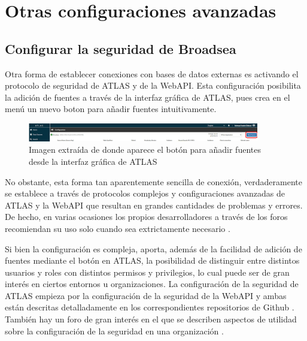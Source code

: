 
\section{Otras configuraciones avanzadas} \label{sec:04ConfigAvanzada}

\subsection{Configurar la seguridad de Broadsea} \label{subsec:04Seguridad}

Otra forma de establecer conexiones con bases de datos externas es activando el protocolo de seguridad de ATLAS y de la WebAPI. Esta configuración posibilita la adición de fuentes a través de la interfaz gráfica de ATLAS, pues crea en el menú  un nuevo boton para añadir fuentes intuitivamente. 

\begin{figure}[H]
    \centering
    \includegraphics[width=0.90\textwidth]{figures/capNewSource.png}
    \caption{Imagen extraída de \parencite{forumAddMSDB} donde aparece el botón para añadir fuentes desde la interfaz gráfica de ATLAS}
    \label{fig:capNewSource}
\end{figure}

No obstante, esta forma tan aparentemente sencilla de conexión, verdaderamente se establece a través de protocolos complejos y configuraciones avanzadas de ATLAS y la WebAPI que resultan en grandes cantidades de problemas y errores. De hecho, en varias ocasiones los propios desarrolladores a través de los foros recomiendan su uso solo cuando sea extrictamente necesario \parencite{forumAddMSDB}\parencite{forumAddSecurityAtlas}.

Si bien la configuración es compleja, aporta, además de la facilidad de adición de fuentes mediante el botón en ATLAS, la posibilidad de distinguir entre distintos usuarios y roles con distintos permisos y privilegios, lo cual puede ser de gran interés en ciertos entornos u organizaciones.  La configuración de la seguridad de ATLAS empieza por la configuración de la seguridad de la WebAPI y ambas están descritas detalladamente en los correspondientes repositorios de Github \parencite{githubWASecurity}\parencite{githubATSecurity}. También hay un foro de gran interés en el que se describen aspectos de utilidad sobre la configuración de la seguridad en una organización \parencite{forumAddSecurityAtlas}.

